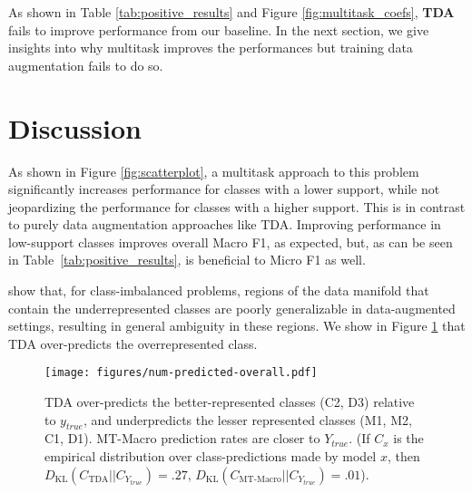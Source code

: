 \documentclass[11pt]{article}
\begin{document}
As shown in Table \ref{tab:positive_results} and Figure \ref{fig:multitask_coefs}, \textbf{TDA} fails to improve performance from our baseline. In the next section, we give insights into why multitask improves the performances but training data augmentation fails to do so. 

\section{Discussion}
\label{sct:discussion}

As shown in Figure \ref{fig:scatterplot}, a multitask approach to this problem significantly increases performance for classes with a lower support, while not jeopardizing the performance for classes with a higher support. This is in contrast to purely data augmentation approaches like TDA. Improving performance in low-support classes improves overall Macro F1, as expected, but, as can be seen in Table~\ref{tab:positive_results}, is beneficial to Micro F1 as well.

 show that, for class-imbalanced problems, regions of the data manifold that contain the underrepresented classes are poorly generalizable in data-augmented settings, resulting in general ambiguity in these regions. We show in Figure \ref{fig:num_predicted} that TDA over-predicts the overrepresented class.

\begin{figure}[t]
    \centering
    \texttt{[image: figures/num-predicted-overall.pdf]}
    \caption{TDA over-predicts the better-represented classes (C2, D3) relative to $y_{true}$, and underpredicts the lesser represented classes (M1, M2, C1, D1). MT-Macro prediction rates are closer to $Y_{true}$. (If $C_{x}$ is the empirical distribution over class-predictions made by model $x$, then $D_{\text{KL}}(C_{\text{TDA}}||C_{Y_{true}})=.27$,  $D_{\text{KL}}(C_{\text{MT-Macro}}||C_{Y_{true}})=.01$).}
    \label{fig:num_predicted}
\end{figure}
\end{document}
